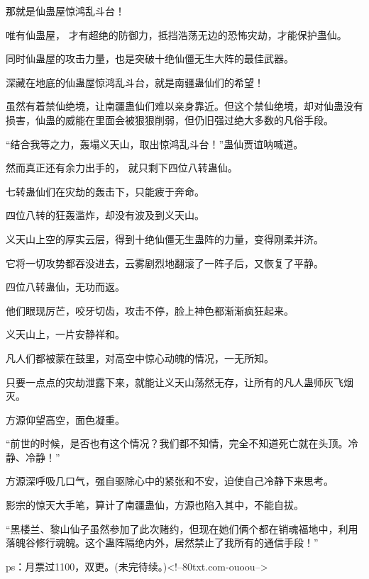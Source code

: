 \begin{this_body}
那就是仙蛊屋惊鸿乱斗台！

唯有仙蛊屋， 才有超绝的防御力，抵挡浩荡无边的恐怖灾劫，才能保护蛊仙。

同时仙蛊屋的攻击力量，也是突破十绝仙僵无生大阵的最佳武器。

深藏在地底的仙蛊屋惊鸿乱斗台，就是南疆蛊仙们的希望！

虽然有着禁仙绝境，让南疆蛊仙们难以亲身靠近。但这个禁仙绝境，却对仙蛊没有损害，仙蛊的威能在里面会被狠狠削弱，但仍旧强过绝大多数的凡俗手段。

“结合我等之力，轰塌义天山，取出惊鸿乱斗台！”蛊仙贾谊呐喊道。

然而真正还有余力出手的， 就只剩下四位八转蛊仙。

七转蛊仙们在灾劫的轰击下，只能疲于奔命。

四位八转的狂轰滥炸，却没有波及到义天山。

义天山上空的厚实云层，得到十绝仙僵无生蛊阵的力量，变得刚柔并济。

它将一切攻势都吞没进去，云雾剧烈地翻滚了一阵子后，又恢复了平静。

四位八转蛊仙，无功而返。

他们眼现厉芒，咬牙切齿，攻击不停，脸上神色都渐渐疯狂起来。

义天山上，一片安静祥和。

凡人们都被蒙在鼓里，对高空中惊心动魄的情况，一无所知。

只要一点点的灾劫泄露下来，就能让义天山荡然无存，让所有的凡人蛊师灰飞烟灭。

方源仰望高空，面色凝重。

“前世的时候，是否也有这个情况？我们都不知情，完全不知道死亡就在头顶。冷静、冷静！”

方源深呼吸几口气，强自驱除心中的紧张和不安，迫使自己冷静下来思考。

影宗的惊天大手笔，算计了南疆蛊仙，方源也陷入其中，不能自拔。

“黑楼兰、黎山仙子虽然参加了此次赌约，但现在她们俩个都在销魂福地中，利用落魄谷修行魂魄。这个蛊阵隔绝内外，居然禁止了我所有的通信手段！”

ps：月票过1100，双更。(未完待续。)<!--80txt.com-ouoou-->

\end{this_body}

